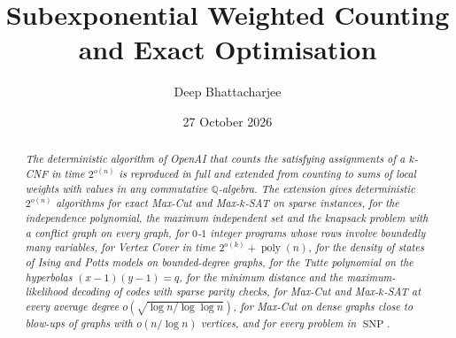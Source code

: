 \documentclass[11pt,reqno]{amsart}
\title[Subexponential weighted counting]{Subexponential Weighted Counting and Exact Optimisation}
\author{Deep Bhattacharjee}
\date{27 October 2026}
\numberwithin{equation}{section}
\theoremstyle{plain}
\theoremstyle{definition}
\theoremstyle{remark}
\DeclareMathOperator{\poly}{poly}
\DeclareMathOperator{\SNP}{SNP}
\newcommand{\Q}{\mathbb{Q}}
\newcommand{\oai}{OpenAI}
\begin{document}
\begin{abstract}
\emph{The deterministic algorithm of \oai{} that counts the satisfying assignments of a
$k$-CNF in time $2^{o(n)}$ is reproduced in full and extended from counting to
sums of local weights with values in any commutative $\Q$-algebra. The extension gives
deterministic $2^{o(n)}$ algorithms for exact Max-Cut and Max-$k$-SAT on sparse instances,
for the independence polynomial, the maximum independent set and the knapsack problem with
a conflict graph on every graph, for $0$-$1$ integer programs whose rows involve boundedly
many variables, for Vertex
Cover in time $2^{o(k)}+\poly(n)$, for the density of states of Ising and Potts models on
bounded-degree graphs, for the Tutte polynomial on the hyperbolas $(x-1)(y-1)=q$, for the
minimum distance and the maximum-likelihood decoding of codes with sparse parity checks,
for Max-Cut and Max-$k$-SAT at every average degree $o(\sqrt{\log n/\log\log n})$, for Max-Cut
on dense graphs close to blow-ups of graphs with $o(n/\log n)$ vertices, and for every problem in $\SNP$.}
\end{abstract}

\maketitle










\appendix



\end{document}
